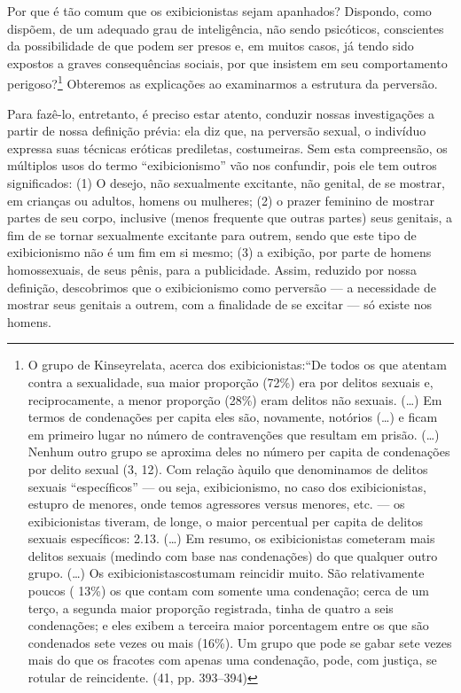 Por que é tão comum que os exibicionistas sejam apanhados?
Dispondo, como dispõem, de um adequado grau de inteligência, não sendo
psicóticos, conscientes da possibilidade de que podem ser presos e, em
muitos casos, já tendo sido expostos a graves consequências sociais,
por que insistem em seu comportamento\idxexibiexpo{} perigoso?\footnote{ O grupo de
Kinsey\idxkins[|nn] relata, acerca dos exibicionistas:\idxexibicond[|nn] ``De todos os
que atentam contra a sexualidade, sua maior proporção (72\%) era por
delitos sexuais e, reciprocamente, a menor proporção (28\%) eram
delitos não sexuais. (\ldots{}) Em termos de condenações per capita eles
são, novamente, notórios (\ldots{}) e ficam em primeiro lugar no número de
contravenções que resultam em prisão. (\ldots{}) Nenhum outro grupo se
aproxima deles no número per capita de condenações por delito sexual
(3, 12). Com relação àquilo que denominamos de delitos sexuais
``específicos'' --- ou seja, exibicionismo,
no caso dos exibicionistas, estupro de menores, onde temos agressores
versus menores, etc. --- os exibicionistas tiveram, de longe, o maior
percentual per capita de delitos sexuais específicos: 2.13. (\ldots{}) Em
resumo, os exibicionistas cometeram mais delitos sexuais (medindo com
base nas condenações) do que qualquer outro grupo. (\ldots{}) Os
exibicionistas\idxexibicond[|nn] costumam reincidir muito. São relativamente poucos (
13\%) os que contam com somente uma condenação; cerca de um terço, a
segunda maior proporção registrada, tinha de quatro a seis condenações;
e eles exibem a terceira maior porcentagem entre os que são condenados
sete vezes ou mais (16\%). Um grupo que pode se gabar sete vezes mais
do que os fracotes com apenas uma condenação, pode, com justiça, se
rotular de reincidente. (41, pp. 393--394)} Obteremos as explicações ao
examinarmos a estrutura da perversão.

Para fazê-lo, entretanto, é preciso estar atento, conduzir nossas
investigações a partir de nossa definição prévia: ela diz que, na
perversão sexual, o indivíduo expressa suas técnicas eróticas
prediletas, costumeiras. Sem esta compreensão, os múltiplos usos do
termo ``exibicionismo'' vão nos confundir,
pois ele tem outros significados: (1) O desejo, não sexualmente
excitante, não genital, de se mostrar, em crianças ou adultos, homens
ou mulheres; (2) o prazer feminino de mostrar partes de seu corpo,
inclusive (menos frequente que outras partes) seus genitais, a fim de
se tornar sexualmente excitante para outrem, sendo que este tipo de
exibicionismo não é um fim em si mesmo; (3) a exibição, por parte de
homens homossexuais,\idxhomosexib{} de seus pênis, para a publicidade. Assim, reduzido
por nossa definição, descobrimos que o exibicionismo como perversão
--- a necessidade de mostrar seus genitais a outrem, com a finalidade
de se excitar --- só existe nos homens.\idxpervpredo{}

